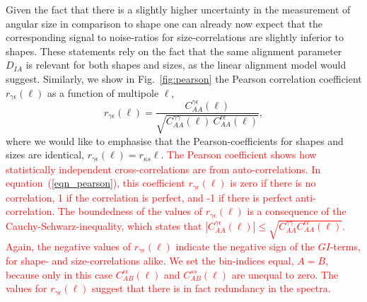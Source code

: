 \documentclass[a4paper,fleqn,usenatbib]{mnras}
\newcommand\spirou[1]{\textcolor{red}{#1}}
\begin{document}
Given the fact that there is a slightly higher uncertainty in the measurement of angular size in comparison to shape one can already now expect that the corresponding signal to noise-ratios for size-correlations are slightly inferior to shapes. These statements rely on the fact that the same alignment parameter $D_{IA}$ is relevant for both shapes and sizes, as the linear alignment model would suggest. Similarly, we show in Fig.~\ref{fig:pearson} the Pearson correlation coefficient $r_{\gamma\epsilon}(\ell)$ as a function of multipole $\ell$,
\begin{equation}
r_{\gamma\epsilon}(\ell) = 
\frac{C^{\gamma\epsilon}_{AA}(\ell)}{\sqrt{C^{\gamma\gamma}_{AA}(\ell)\: C^{\epsilon\epsilon}_{AA}(\ell)}},
\label{eqn_pearson}
\end{equation}
where we would like to emphasise that the Pearson-coefficients for shapes and sizes are identical, $r_{\gamma\epsilon}(\ell) = r_{\kappa s}{\ell}$. \spirou{The Pearson coefficient shows how statistically independent cross-correlations are from auto-correlations. In equation~(\ref{eqn_pearson}), this coefficient $r_{\gamma\epsilon}(\ell)$ is zero if there is no correlation, 1 if the correlation is perfect, and -1 if there is perfect anti-correlation. The boundedness of the values of $r_{\gamma\epsilon}(\ell)$ is a consequence of the Cauchy-Schwarz-inequality, which states that $\left|C^{\gamma\epsilon}_{AA}(\ell)\right|\leq\sqrt{C^{\gamma\gamma}_{AA}C^{\epsilon\epsilon}_{AA}(\ell)}$. Again, the negative values of $r_{\gamma\epsilon}(\ell)$ indicate the negative sign of the $GI$-terms, for shape- and size-correlations alike. We set the bin-indices equal, $A = B$, because only in this case $C^{\epsilon\epsilon}_{AB}(\ell)$ and $C^{ss}_{AB}(\ell)$ are unequal to zero. The values for $r_{\gamma\epsilon}(\ell)$ suggest that there is in fact redundancy in the spectra.} 
\end{document}
